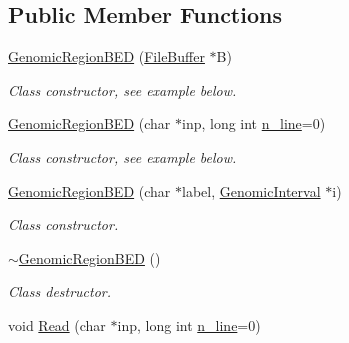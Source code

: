 \subsection*{Public Member Functions}
\begin{CompactItemize}
\item 
\hypertarget{classGenomicRegionBED_89d54edc5809d113202c9f09f82e1057}{
\hyperlink{classGenomicRegionBED_89d54edc5809d113202c9f09f82e1057}{GenomicRegionBED} (\hyperlink{classFileBuffer}{FileBuffer} $\ast$B)}
\label{classGenomicRegionBED_89d54edc5809d113202c9f09f82e1057}

\begin{CompactList}\small\item\em Class constructor, see example below. \item\end{CompactList}\item 
\hypertarget{classGenomicRegionBED_4d7c87327c1074258ac1e6b5ac87c9dd}{
\hyperlink{classGenomicRegionBED_4d7c87327c1074258ac1e6b5ac87c9dd}{GenomicRegionBED} (char $\ast$inp, long int \hyperlink{classGenomicRegion_efe2255aeed5338060190ded05cb9c0c}{n\_\-line}=0)}
\label{classGenomicRegionBED_4d7c87327c1074258ac1e6b5ac87c9dd}

\begin{CompactList}\small\item\em Class constructor, see example below. \item\end{CompactList}\item 
\hypertarget{classGenomicRegionBED_a6e68da10b635bcd84bf320b94a4d414}{
\hyperlink{classGenomicRegionBED_a6e68da10b635bcd84bf320b94a4d414}{GenomicRegionBED} (char $\ast$label, \hyperlink{classGenomicInterval}{GenomicInterval} $\ast$i)}
\label{classGenomicRegionBED_a6e68da10b635bcd84bf320b94a4d414}

\begin{CompactList}\small\item\em Class constructor. \item\end{CompactList}\item 
\hypertarget{classGenomicRegionBED_a27241b7fbdb90e0b4b1e411045d080f}{
\hyperlink{classGenomicRegionBED_a27241b7fbdb90e0b4b1e411045d080f}{$\sim$GenomicRegionBED} ()}
\label{classGenomicRegionBED_a27241b7fbdb90e0b4b1e411045d080f}

\begin{CompactList}\small\item\em Class destructor. \item\end{CompactList}\item 
\hypertarget{classGenomicRegionBED_707a1744e040214d78d37b928f1f0252}{
void \hyperlink{classGenomicRegionBED_707a1744e040214d78d37b928f1f0252}{Read} (char $\ast$inp, long int \hyperlink{classGenomicRegion_efe2255aeed5338060190ded05cb9c0c}{n\_\-line}=0)}
\label{classGenomicRegionBED_707a1744e040214d78d37b928f1f0252}


\end{CompactItemize}
